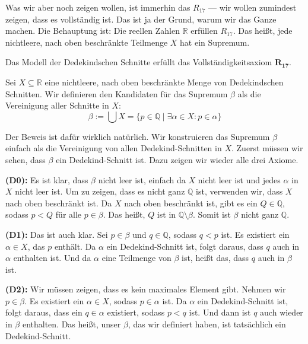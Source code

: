\begin{spoken-clean}[01:12:45 - 01:15:30]
Was wir aber noch zeigen wollen, ist immerhin das $R_{17}$ --- wir wollen zumindest zeigen, dass es vollständig ist. Das ist ja der Grund, warum wir das Ganze machen. Die Behauptung ist: Die reellen Zahlen $\mathbb{R}$ erfüllen $R_{17}$. Das heißt, jede nichtleere, nach oben beschränkte Teilmenge $X$ hat ein Supremum.
\end{spoken-clean}

\begin{math-stroke}
\begin{theorem}[Vollständigkeitssatz]\label{thm:vollstaendigkeit-reell}
Das Modell der Dedekindschen Schnitte erfüllt das Vollständigkeitsaxiom $\mathbf{R_{17}}$.
\end{theorem}

\begin{short-proof}[Beweisidee]
Sei $X \subseteq \mathbb{R}$ eine nichtleere, nach oben beschränkte Menge von Dedekindschen Schnitten. Wir definieren den Kandidaten für das Supremum $\beta$ als die Vereinigung aller Schnitte in $X$:
\begin{equation}
\label{eq:supremum-konstruktion}
\beta := \bigcup X = \{ p \in \mathbb{Q} \mid \exists \alpha \in X \colon p \in \alpha \}
\end{equation}
\end{short-proof}
\end{math-stroke}

\begin{spoken-clean}[01:15:30 - 01:18:15]
Der Beweis ist dafür wirklich natürlich. Wir konstruieren das Supremum $\beta$ einfach als die Vereinigung von allen Dedekind-Schnitten in $X$. Zuerst müssen wir sehen, dass $\beta$ ein Dedekind-Schnitt ist. Dazu zeigen wir wieder alle drei Axiome.

\textbf{(D0):} Es ist klar, dass $\beta$ nicht leer ist, einfach da $X$ nicht leer ist und jedes $\alpha$ in $X$ nicht leer ist. Um zu zeigen, dass es nicht ganz $\mathbb{Q}$ ist, verwenden wir, dass $X$ nach oben beschränkt ist. Da $X$ nach oben beschränkt ist, gibt es ein $Q \in \mathbb{Q}$, sodass $p < Q$ für alle $p \in \beta$. Das heißt, $Q$ ist in $\mathbb{Q} \setminus \beta$. Somit ist $\beta$ nicht ganz $\mathbb{Q}$.

\textbf{(D1):} Das ist auch klar. Sei $p \in \beta$ und $q \in \mathbb{Q}$, sodass $q < p$ ist. Es existiert ein $\alpha \in X$, das $p$ enthält. Da $\alpha$ ein Dedekind-Schnitt ist, folgt daraus, dass $q$ auch in $\alpha$ enthalten ist. Und da $\alpha$ eine Teilmenge von $\beta$ ist, heißt das, dass $q$ auch in $\beta$ ist.

\textbf{(D2):} Wir müssen zeigen, dass es kein maximales Element gibt. Nehmen wir $p \in \beta$. Es existiert ein $\alpha \in X$, sodass $p \in \alpha$ ist. Da $\alpha$ ein Dedekind-Schnitt ist, folgt daraus, dass ein $q \in \alpha$ existiert, sodass $p < q$ ist. Und dann ist $q$ auch wieder in $\beta$ enthalten. Das heißt, unser $\beta$, das wir definiert haben, ist tatsächlich ein Dedekind-Schnitt.
\end{spoken-clean}

